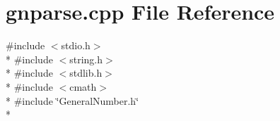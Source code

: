 \section{gnparse.\+cpp File Reference}
\label{gnparse_8cpp}
{\ttfamily \#include $<$stdio.\+h$>$}\\*
{\ttfamily \#include $<$string.\+h$>$}\\*
{\ttfamily \#include $<$stdlib.\+h$>$}\\*
{\ttfamily \#include $<$cmath$>$}\\*
{\ttfamily \#include \char`\"{}General\+Number.\+h\char`\"{}}\\*
